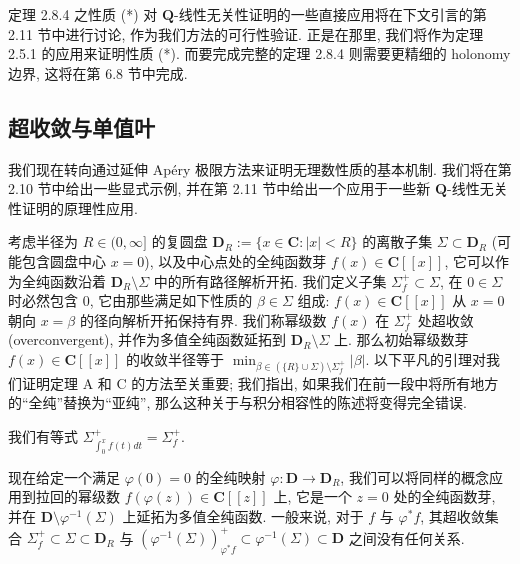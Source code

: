 定理 2.8.4 之性质 (*) 对 \(\mathbf{Q}\)-线性无关性证明的一些直接应用将在下文引言的第 2.11 节中进行讨论, 作为我们方法的可行性验证. 正是在那里, 我们将作为定理 2.5.1 的应用来证明性质 (*). 而要完成完整的定理 2.8.4 则需要更精细的 holonomy 边界, 这将在第 6.8 节中完成.

\subsection{超收敛与单值叶}\label{sec:2.9}

我们现在转向通过延伸 Ap{\'e}ry 极限方法来证明无理数性质的基本机制. 我们将在第 2.10 节中给出一些显式示例, 并在第 2.11 节中给出一个应用于一些新 \(\mathbf{Q}\)-线性无关性证明的原理性应用.

考虑半径为 \(R \in (0, \infty]\) 的复圆盘 \(\mathbf{D}_R := \{x \in \mathbf{C} : |x| < R\}\) 的离散子集 \(\Sigma \subset \mathbf{D}_R\) (可能包含圆盘中心 $x = 0$), 以及中心点处的全纯函数芽 \(f(x) \in \mathbf{C}[\! [x]\!]\), 它可以作为全纯函数沿着 \(\mathbf{D}_R \setminus \Sigma\) 中的所有路径解析开拓. 我们定义子集 \(\Sigma_f^+ \subset \Sigma\), 在 \(0 \in \Sigma\) 时必然包含 \(0\), 它由那些满足如下性质的 \(\beta \in \Sigma\) 组成: \(f(x) \in \mathbf{C}[\! [x]\!]\) 从 \(x = 0\) 朝向 \(x = \beta\) 的径向解析开拓保持有界. 我们称幂级数 \(f(x)\) 在 \(\Sigma_f^+\) 处超收敛 (overconvergent), 并作为多值全纯函数延拓到 \(\mathbf{D}_R \setminus \Sigma\) 上. 那么初始幂级数芽 \(f(x) \in \mathbf{C}[\! [x]\!]\) 的收敛半径等于 \(\min_{\beta \in (\{R\} \cup \Sigma) \setminus \Sigma_f^+} |\beta|\). 以下平凡的引理对我们证明定理 A 和 C 的方法至关重要; 我们指出, 如果我们在前一段中将所有地方的“全纯”替换为“亚纯”, 那么这种关于与积分相容性的陈述将变得完全错误.

\begin{lemma}\label{lem:2.9.1}
我们有等式 \(\Sigma_{\int_0^x f(t) dt}^+ = \Sigma_f^+\).
\end{lemma}

现在给定一个满足 \(\varphi(0) = 0\) 的全纯映射 \(\varphi: \mathbf{D} \to \mathbf{D}_R\), 我们可以将同样的概念应用到拉回的幂级数 \(f(\varphi(z)) \in \mathbf{C}[\! [z]\!]\) 上, 它是一个 \(z = 0\) 处的全纯函数芽, 并在 \(\mathbf{D} \setminus \varphi^{-1}(\Sigma)\) 上延拓为多值全纯函数. 一般来说, 对于 \(f\) 与 \(\varphi^*f\), 其超收敛集合 \(\Sigma_f^+ \subset \Sigma \subset \mathbf{D}_R\) 与 \((\varphi^{-1}(\Sigma))_{\varphi^*f}^+ \subset \varphi^{-1}(\Sigma) \subset \mathbf{D}\) 之间没有任何关系.

